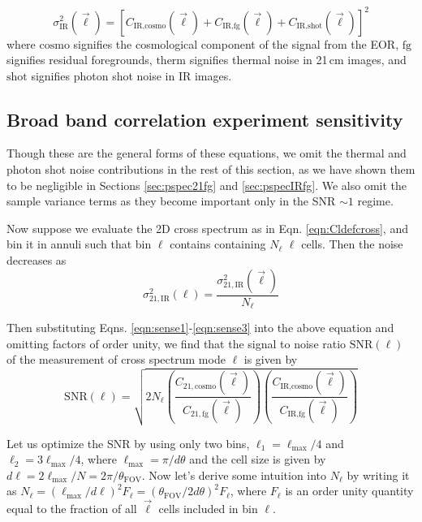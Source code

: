 \documentclass[preprint]{aastex}
\newcommand{\IR}{\text{IR}}
\newcommand{\therm}{\text{therm}}
\newcommand{\cosmo}{\text{cosmo}}
\newcommand{\fg}{\text{fg}}
\newcommand{\shot}{\text{shot}}
\newcommand{\SNR}{\text{SNR}}
\begin{document}
\begin{equation}
\label{eqn:sense3}
	\sigma_{\IR}^2(\vec{\ell})=[C_{\IR,\cosmo}(\vec{\ell})+C_{\IR,\fg}(\vec{\ell})+C_{\IR,\shot}(\vec{\ell})]^2
\end{equation}
where $\cosmo$ signifies the cosmological component of the signal from the EOR, $\fg$ signifies residual foregrounds, $\therm$ signifies thermal noise in 21\,cm images, and $\shot$ signifies photon shot noise in IR images. 

\subsection{Broad band correlation experiment sensitivity}

Though these are the general forms of these equations, we omit the thermal and photon shot noise contributions in the rest of this section, as we have shown them to be negligible in Sections \ref{sec:pspec21fg} and \ref{sec:pspecIRfg}. We also omit the sample variance terms as they become important only in the SNR $\sim1$ regime. 

Now suppose we evaluate the 2D cross spectrum as in Eqn. \ref{eqn:Cldefcross}, and bin it in annuli such that bin $\ell$ contains containing $N_\ell$ $\ell$ cells. Then the noise decreases as
\begin{equation}
	\sigma_{21,\IR}^2(\ell) = \frac{\sigma_{21,\IR}^2(\vec{\ell}) }{N_\ell}
\end{equation}

Then substituting Eqns. \ref{eqn:sense1}-\ref{eqn:sense3} into the above equation and omitting factors of order unity, we find that the signal to noise ratio $\SNR(\ell)$ of the measurement of cross spectrum mode $\ell$ is given by
\begin{equation}
	\SNR(\ell) = \sqrt{
		2N_\ell
	\left(\frac{C_{21,\cosmo}(\vec{\ell})  }{ C_{21,\fg}(\vec{\ell}) }\right)
	\left(\frac{C_{\IR,\cosmo}(\vec{\ell})  }{ C_{\IR,\fg}(\vec{\ell}) }\right)
	}
\end{equation}

Let us optimize the SNR by using only two bins, $\ell_1=\ell_\text{max}/4$ and $\ell_2=3\ell_\text{max}/4$, where $\ell_\text{max}=\pi/d\theta$ and the cell size is given by $d\ell=2\ell_\text{max}/N=2\pi/\theta_\text{FOV}$. Now let's derive some intuition into $N_\ell$ by writing it as $N_\ell=(\ell_\text{max}/d\ell)^2F_\ell=(\theta_\text{FOV}/2d\theta)^2F_\ell$, where $F_\ell$ is an order unity quantity equal to the fraction of all $\vec{\ell}$ cells included in bin $\ell$.
\end{document}
